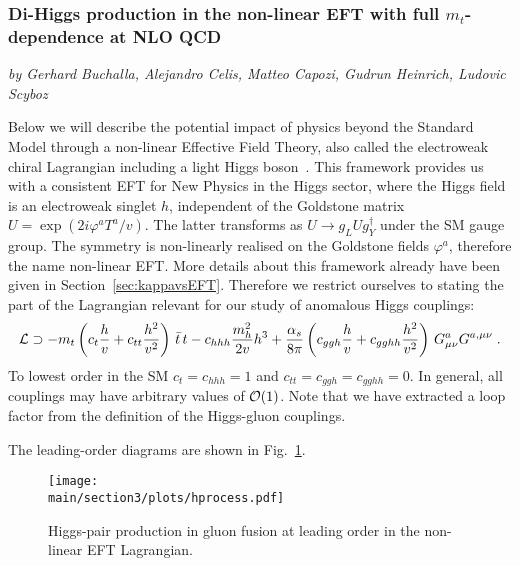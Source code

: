 \subsubsection{Di-Higgs production in the non-linear EFT with full $m_t$-dependence at NLO QCD}

\begin{center}
\textit{by Gerhard Buchalla, Alejandro Celis, Matteo Capozi, Gudrun Heinrich, Ludovic Scyboz}
\end{center}


\label{sec:EWChL.double.h}

Below we will describe  the potential impact of physics
beyond the Standard Model through a non-linear Effective Field Theory,
also called the electroweak chiral Lagrangian
including a light Higgs 
boson~\cite{Buchalla:2013rka,Buchalla:2013eza,Buchalla:2017jlu}.
This framework provides us with a consistent EFT
for New Physics in the Higgs sector, where the Higgs field is an electroweak singlet $h$,
independent of the Goldstone matrix $U = \exp(2i\varphi^a T^a/v)$.
The latter transforms as $U\to g_L U g^\dagger_Y$ under the SM gauge group.
The symmetry is non-linearly realised on the Goldstone fields
$\varphi^a$, therefore the name non-linear EFT.
More details about this framework already have been given in
Section~\ref{sec:kappavsEFT}.
Therefore we restrict ourselves to stating the part of the Lagrangian
relevant for our study of anomalous Higgs couplings:
\begin{align}
{\cal L}\supset 
-m_t\left(c_t\frac{h}{v}+c_{tt}\frac{h^2}{v^2}\right)\,\bar{t}\,t -
c_{hhh} \frac{m_h^2}{2v} h^3+\frac{\alpha_s}{8\pi} \left( c_{ggh} \frac{h}{v}+
c_{gghh}\frac{h^2}{v^2}  \right)\, G^a_{\mu \nu} G^{a,\mu \nu}\;.
\label{eq:ewchl}
\end{align}
To lowest order in the SM $c_t=c_{hhh}=1$ and $c_{tt}=c_{ggh}=c_{gghh}=0$.
In general, all couplings may have arbitrary values of ${\cal O}(1)$.
Note that we have extracted a loop factor from the definition of the
Higgs-gluon couplings.  


The leading-order diagrams are shown in Fig.~\ref{fig:hprocess}.
\begin{figure}[htb]
\begin{center}
\texttt{[image: \\main/section3/plots/hprocess.pdf]}
\end{center}
\caption{Higgs-pair production in gluon fusion at leading order
in the non-linear EFT Lagrangian.}
\label{fig:hprocess}
\end{figure}

